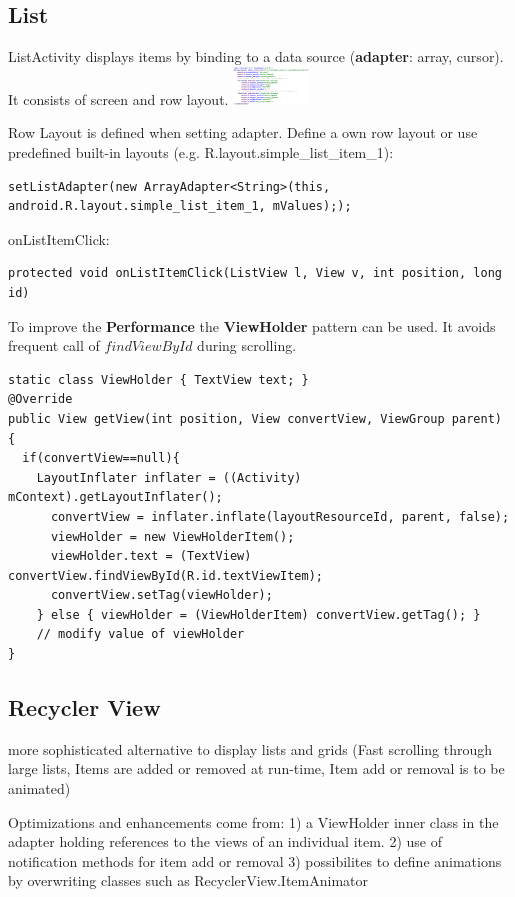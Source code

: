 \subsection{List}
ListActivity displays items by binding to a data source (\textbf{adapter}:
array, cursor). It consists of screen and row layout.
\includegraphics[width=0.15\textwidth]{android/list_layout_example.png}

Row Layout is defined when setting adapter. Define a own row layout or use
predefined built-in layouts (e.g. R.layout.simple\_list\_item\_1):
\begin{lstlisting}
setListAdapter(new ArrayAdapter<String>(this,
android.R.layout.simple_list_item_1, mValues););
\end{lstlisting}

onListItemClick:
\begin{lstlisting}
protected void onListItemClick(ListView l, View v, int position, long id)
\end{lstlisting}

To improve the \textbf{Performance} the \textbf{ViewHolder} pattern can be
used. It avoids frequent call of $findViewById$ during scrolling.
\begin{lstlisting}
static class ViewHolder { TextView text; }
@Override
public View getView(int position, View convertView, ViewGroup parent) {
  if(convertView==null){
    LayoutInflater inflater = ((Activity) mContext).getLayoutInflater();
      convertView = inflater.inflate(layoutResourceId, parent, false);
      viewHolder = new ViewHolderItem();
      viewHolder.text = (TextView) convertView.findViewById(R.id.textViewItem);
      convertView.setTag(viewHolder);
    } else { viewHolder = (ViewHolderItem) convertView.getTag(); }
    // modify value of viewHolder
}
\end{lstlisting}


\subsection{Recycler View}
more sophisticated alternative to display lists and grids (Fast scrolling
through large lists, Items are added or removed at run-time, Item add or
removal is to be animated)

Optimizations and enhancements come from:
1) a ViewHolder inner class in the adapter holding references to the views of
an individual item.
2) use of notification methods for item add or removal
3) possibilites to define animations by overwriting classes such as
RecyclerView.ItemAnimator


